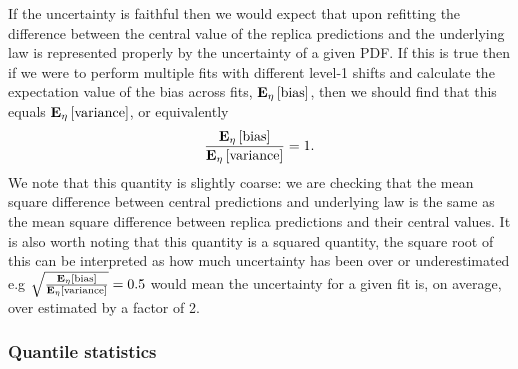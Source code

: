 If the uncertainty is faithful then we would expect that upon refitting the
difference between the central value of the replica predictions and the
underlying law is represented properly by the uncertainty of a given PDF. If
this is true then if we were to perform multiple fits with different level-1
shifts and calculate the expectation value of the bias across fits,
$\mathbf{E}_{\eta}\left[ {\rm bias} \right]$, then we should find that this equals $\mathbf{E}_{\eta}\left[ {\rm variance} \right]$, or
equivalently
\begin{equation}
    \label{eq:BiasVarRatio}
    \frac{\mathbf{E}_{\eta}\left[ {\rm bias} \right]}{\mathbf{E}_{\eta}\left[ {\rm variance} \right]} = 1.
\end{equation}
We note that this quantity is slightly coarse: we are checking that the mean
square difference between central predictions and underlying law is the same as
the mean square difference between replica predictions and their central values.
It is also worth noting that this quantity is a squared quantity, the square
root of this can be interpreted as how much uncertainty has been over or
underestimated e.g $\sqrt{\frac{\mathbf{E}_{\eta}\left[ {\rm bias} \right]}{\mathbf{E}_{\eta}\left[ {\rm variance} \right]}} = 0.5$ would
mean the uncertainty for a given fit is, on average, over estimated by a factor
of 2.

\subsubsection{Quantile statistics}

